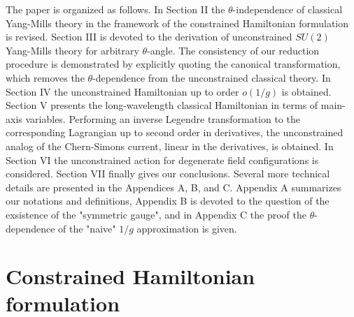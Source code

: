 \documentclass[a4paper,12pt]{article}
\begin{document}
The paper is organized as follows.
In Section II the $\theta$-independence of classical Yang-Mills
theory in the framework of the constrained Hamiltonian formulation is revised.
Section III is devoted to the derivation of
unconstrained $SU(2)$ Yang-Mills theory for arbitrary $\theta$-angle.
The consistency of our reduction procedure is demonstrated by
explicitly quoting the canonical transformation,
which removes the $\theta$-dependence from the unconstrained
classical theory.
In Section IV the unconstrained Hamiltonian up to
order $o(1/g)$ is obtained.
Section V presents the long-wavelength classical
Hamiltonian in terms of main-axis variables.
Performing an inverse Legendre transformation to the corresponding
Lagrangian up to second order in derivatives, the unconstrained analog
of the Chern-Simons current, linear in the derivatives, is obtained.
In Section VI the unconstrained action for degenerate field configurations
is considered.
Section VII finally gives our conclusions.
Several more technical details are presented in the Appendices A, B, and C.
Appendix A summarizes our notations and definitions,
Appendix B is devoted to the question of the exsistence of the "symmetric
gauge", and in Appendix C the proof the $\theta$-dependence of the
"naive" $1/g$ approximation is given.


\section{Constrained Hamiltonian formulation}


\label{sec:cedg}
\end{document}
